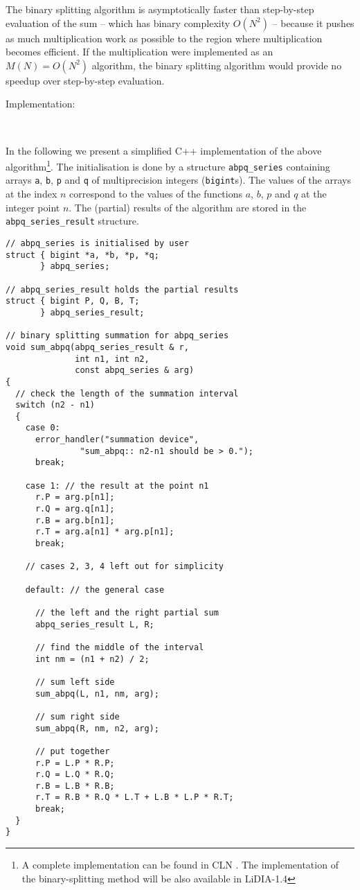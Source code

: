 The binary splitting algorithm is asymptotically faster than step-by-step
evaluation of the sum -- which has binary complexity  \( O(N^{2}) \) -- because
it pushes as much multiplication work as possible to the region where
multiplication becomes efficient. If the multiplication were implemented
as an  \( M(N)=O(N^{2}) \) algorithm, the binary splitting algorithm would
provide no speedup over step-by-step evaluation.

\begin{description}
\item [Implementation:]~
\end{description}

In the following we present a simplified C++ implementation of
the above algorithm\footnote{A complete implementation can be found in 
CLN \cite{96a}. The implementation of the binary-splitting method will
be also available in {\sf LiDIA-1.4}}. The initialisation is done by a
structure {\tt abpq\_series} containing arrays {\tt a}, {\tt b}, {\tt p}
and {\tt q} of multiprecision integers ({\tt bigint}s). The values of
the arrays at the index \( n \) correspond to the values of the functions
\( a \), \( b \), \( p \) and \( q \) at the integer point \( n \).
The (partial) results of the algorithm are stored in the
{\tt abpq\_series\_result} structure.

\begin{verbatim}
// abpq_series is initialised by user
struct { bigint *a, *b, *p, *q; 
       } abpq_series;

// abpq_series_result holds the partial results
struct { bigint P, Q, B, T; 
       } abpq_series_result;

// binary splitting summation for abpq_series
void sum_abpq(abpq_series_result & r, 
              int n1, int n2, 
              const abpq_series & arg)
{
  // check the length of the summation interval
  switch (n2 - n1)
  {
    case 0:
      error_handler("summation device", 
               "sum_abpq:: n2-n1 should be > 0.");
      break;

    case 1: // the result at the point n1
      r.P = arg.p[n1];
      r.Q = arg.q[n1];
      r.B = arg.b[n1];
      r.T = arg.a[n1] * arg.p[n1];
      break;

    // cases 2, 3, 4 left out for simplicity

    default: // the general case

      // the left and the right partial sum
      abpq_series_result L, R;

      // find the middle of the interval
      int nm = (n1 + n2) / 2;

      // sum left side
      sum_abpq(L, n1, nm, arg);

      // sum right side
      sum_abpq(R, nm, n2, arg);

      // put together
      r.P = L.P * R.P;
      r.Q = L.Q * R.Q;
      r.B = L.B * R.B;
      r.T = R.B * R.Q * L.T + L.B * L.P * R.T;
      break;
  }
}
\end{verbatim}

